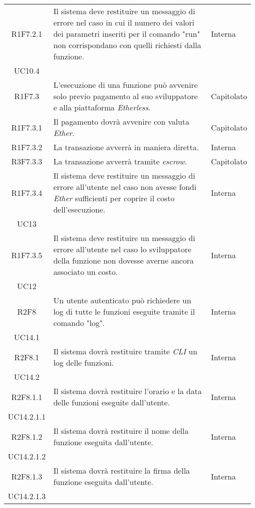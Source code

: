 \begin{longtable}{|c|p{8cm}|C{2cm}|}
	R1F7.2.1 &  Il sistema deve restituire un messaggio di errore nel caso in cui il numero dei valori dei parametri inseriti per il comando "run" non corrispondano con quelli richiesti dalla funzione.  & \centering Interna \\ UC10.4 \tabularnewline
		
	R1F7.3 &  L'esecuzione di una funzione può avvenire solo previo pagamento al suo sviluppatore e alla piattaforma \textit{Etherless}. & Capitolato \\
	
	R1F7.3.1 &  Il pagamento dovrà avvenire con valuta \textit{Ether\glos}. & Capitolato \\
	
	R1F7.3.2 &  La transazione avverrà in maniera diretta. & Interna \\
	
	R3F7.3.3 &  La transazione avverrà tramite \textit{escrow\glos}. & Capitolato \\
	
	R1F7.3.4 &  Il sistema deve restituire un messaggio di errore all'utente nel caso non avesse fondi  \textit{Ether\glos} sufficienti per coprire il costo dell'esecuzione. & \centering Interna \\ UC13 \tabularnewline
	
	R1F7.3.5 &  Il sistema deve restituire un messaggio di errore all'utente nel caso lo sviluppatore della funzione non dovesse averne ancora associato un costo. & \centering Interna \\ UC12 \tabularnewline
	
	R2F8 &  Un utente autenticato può richiedere un log di tutte le funzioni eseguite tramite il comando "log". & \centering Interna \\ UC14.1 \tabularnewline
	
	R2F8.1 &  Il sistema dovrà restituire tramite \textit{CLI\glo} un log delle funzioni. & \centering Interna \\ UC14.2 \tabularnewline
	
	R2F8.1.1 &  Il sistema dovrà restituire l'orario e la data delle funzioni eseguite dall'utente. & \centering Interna \\ UC14.2.1.1 \tabularnewline
	
	R2F8.1.2 &  Il sistema dovrà restituire il nome della funzione eseguita dall'utente. & \centering Interna \\ UC14.2.1.2 \tabularnewline
	
	R2F8.1.3 &  Il sistema dovrà restituire la firma della funzione eseguita dall'utente. & \centering Interna \\ UC14.2.1.3 \tabularnewline
	

\end{longtable}
